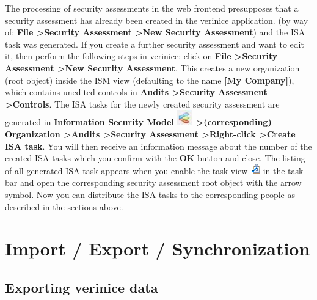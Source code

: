 \documentclass[a4paper,10pt]{book}
\begin{document}
The processing of security assessments in the web frontend presupposes that a security assessment has already been created in the verinice application.
(by way of: \textbf{File \textgreater Security Assessment \textgreater New Security Assessment}) and the ISA task was generated. If you create a further security assessment
and want to edit it, then perform the following steps in verinice: click on  \textbf{File \textgreater Security Assessment \textgreater New Security Assessment}.
This creates a new organization (root object) inside the ISM view (defaulting to the name \textbf{[My Company]}),
which contains unedited controls in \textbf{Audits \textgreater Security Assessment \textgreater Controls}.
The ISA tasks for the newly created security assessment are generated in \textbf{Information Security Model
\includegraphics[height=2ex]{Icon/Informationssicherheitsmodell.png} \textgreater (corresponding) Organization \textgreater Audits \textgreater Security Assessment \textgreater Right-click \textgreater Create ISA task}.
You will then receive an information message about the number of the created ISA tasks which you confirm with the \textbf{OK} button and close.
The listing of all generated ISA task appears when you enable the task view \includegraphics[height=2ex]{Icon/Tasks.png} in the task bar and open the corresponding security assessment root object with the arrow symbol.
Now you can distribute the ISA tasks to the corresponding people as described in the sections above.

\chapter{Import / Export / Synchronization}
\section{Exporting verinice data}
\label{sec:exporting-verinice-data}
\end{document}
